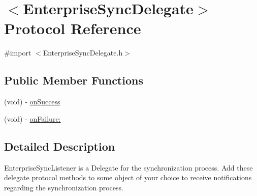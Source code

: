 \hypertarget{protocol_enterprise_sync_delegate-p}{
\section{$<$EnterpriseSyncDelegate$>$ Protocol Reference}
\label{protocol_enterprise_sync_delegate-p}
}


{\ttfamily \#import $<$EnterpriseSyncDelegate.h$>$}

\subsection*{Public Member Functions}
\begin{DoxyCompactItemize}
\item 
(void) -\/ \hyperlink{protocol_enterprise_sync_delegate-p_ad58ceecd0a85bf8d7afca7054bdeac3e}{onSuccess}
\item 
(void) -\/ \hyperlink{protocol_enterprise_sync_delegate-p_acc7d647c0dd26008c54ff6c3332f4cdc}{onFailure:}
\end{DoxyCompactItemize}


\subsection{Detailed Description}
EnterpriseSyncListener is a Delegate for the synchronization process. Add these delegate protocol methods to some object of your choice to receive notifications regarding the synchronization process. 

